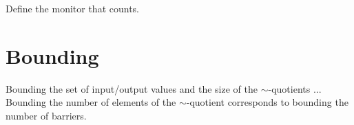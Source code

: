 Define the monitor that counts.
 
\section{Bounding}

Bounding the set of input/output values and the size of the $\sim$-quotients ... Bounding the number of elements of the $\sim$-quotient corresponds to bounding the number of barriers.

